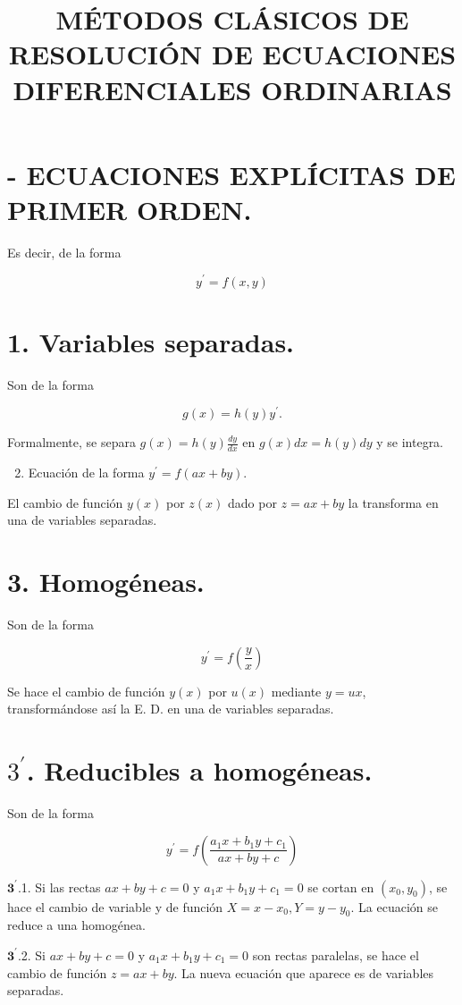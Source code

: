 \documentclass[10pt]{article}
\title{MÉTODOS CLÁSICOS DE RESOLUCIÓN DE ECUACIONES DIFERENCIALES ORDINARIAS }
\author{}
\date{}
\begin{document}
\maketitle
\section*{- ECUACIONES EXPLÍCITAS DE PRIMER ORDEN.}
Es decir, de la forma

$$
y^{\prime}=f(x, y)
$$

\section*{1. Variables separadas.}
Son de la forma

$$
g(x)=h(y) y^{\prime} .
$$

Formalmente, se separa $g(x)=h(y) \frac{d y}{d x}$ en $g(x) d x=h(y) d y$ y se integra.

\begin{enumerate}
  \setcounter{enumi}{1}
  \item Ecuación de la forma $y^{\prime}=f(a x+b y)$.
\end{enumerate}

El cambio de función $y(x)$ por $z(x)$ dado por $z=a x+b y$ la transforma en una de variables separadas.

\section*{3. Homogéneas.}
Son de la forma

$$
y^{\prime}=f\left(\frac{y}{x}\right)
$$

Se hace el cambio de función $y(x)$ por $u(x)$ mediante $y=u x$, transformándose así la E. D. en una de variables separadas.

\section*{$3^{\prime}$. Reducibles a homogéneas.}
Son de la forma

$$
y^{\prime}=f\left(\frac{a_{1} x+b_{1} y+c_{1}}{a x+b y+c}\right)
$$

$\mathbf{3}^{\prime}$.1. Si las rectas $a x+b y+c=0$ y $a_{1} x+b_{1} y+c_{1}=0$ se cortan en $\left(x_{0}, y_{0}\right)$, se hace el cambio de variable y de función $X=x-x_{0}, Y=y-y_{0}$. La ecuación se reduce a una homogénea.

$\mathbf{3}^{\prime}$.2. Si $a x+b y+c=0$ y $a_{1} x+b_{1} y+c_{1}=0$ son rectas paralelas, se hace el cambio de función $z=a x+b y$. La nueva ecuación que aparece es de variables separadas.
\end{document}
